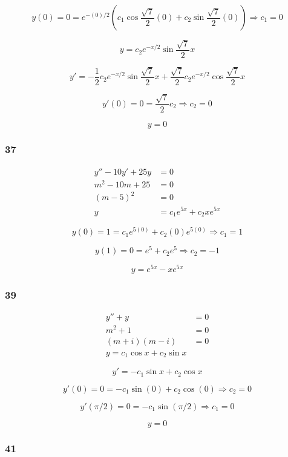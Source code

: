 \documentclass{article}
\begin{document}
\[y(0) = 0 = e^{-(0) / 2} \left( c_1 \cos \frac{\sqrt{7}}{2} (0) + c_2 \sin \frac{\sqrt{7}}{2} (0) \right) \Rightarrow c_1 = 0\]

\[y = c_2 e^{-x / 2} \sin \frac{\sqrt{7}}{2} x\]

\[y' = -\frac{1}{2} c_2 e^{-x / 2} \sin \frac{\sqrt{7}}{2} x + \frac{\sqrt{7}}{2} c_2 e^{-x / 2} \cos \frac{\sqrt{7}}{2} x\]

\[y'(0) = 0 = \frac{\sqrt{7}}{2} c_2 \Rightarrow c_2 = 0\]

\[y = 0\]

\subsubsection{37}

\begin{align*}
  y'' - 10y' + 25y & = 0                         \\
  m^2 - 10m + 25   & = 0                         \\
  (m - 5)^2        & = 0                         \\
  y                & = c_1 e^{5x} + c_2 x e^{5x}
\end{align*}

\[y(0) = 1 = c_1 e^{5 (0)} + c_2 (0) e^{5 (0)} \Rightarrow c_1 = 1\]

\[y(1) = 0 = e^5 + c_2 e^5 \Rightarrow c_2 = -1\]

\[y = e^{5x} - x e^{5x}\]

\subsubsection{39}

\begin{align*}
  y'' + y         & = 0 \\
  m^2 + 1         & = 0 \\
  (m + i) (m - i) & = 0 \\
  y = c_1 \cos x + c_2 \sin x
\end{align*}

\[y' = -c_1 \sin x + c_2 \cos x\]

\[y'(0) = 0 = -c_1 \sin (0) + c_2 \cos (0) \Rightarrow c_2 = 0\]

\[y'(\pi / 2) = 0 = -c_1 \sin (\pi / 2) \Rightarrow c_1 = 0\]

\[y = 0\]

\subsubsection{41}
\end{document}
